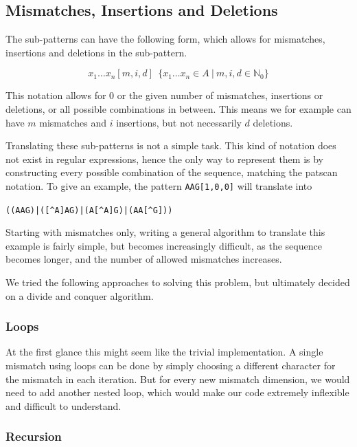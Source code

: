 \documentclass[12pt]{article}
\begin{document}
\subsection{Mismatches, Insertions and Deletions}

The sub-patterns can have the following form, which allows for mismatches, insertions and deletions in the sub-pattern. 

\begin{equation}
	x_1 \ldots x_n[m, i, d] \ \ \{ x_1 \ldots x_n \in A \ | \ m, i, d \in \mathbb{N}_0 \}
\end{equation} 

This notation allows for 0 or the given number of mismatches, insertions or deletions, or all possible combinations in between. This means we for example can have $m$ mismatches and $i$ insertions, but not necessarily $d$ deletions.

Translating these sub-patterns is not a simple task. This kind of notation does not exist in regular expressions, hence the only way to represent them is by constructing every possible combination of the sequence, matching the patscan notation. To give an example, the pattern \texttt{AAG[1,0,0]} will translate into 

\hspace*{\fill}
\texttt{((AAG)|([\^{}A]AG)|(A[\^{}A]G)|(AA[\^{}G]))}
\hspace*{\fill}

Starting with mismatches only, writing a general algorithm to translate this example is fairly simple, but becomes increasingly difficult, as the sequence becomes longer, and the number of allowed mismatches increases.

We tried the following approaches to solving this problem, but ultimately decided on a divide and conquer algorithm. 

\subsubsection{Loops}

At the first glance this might seem like the trivial implementation. A single mismatch using loops can be done by simply choosing a different character for the mismatch in each iteration.
But for every new mismatch dimension, we would need to add another nested loop, which would make our code extremely inflexible and difficult to understand.

\subsubsection{Recursion}
\end{document}
